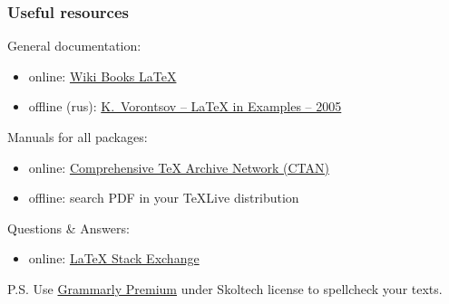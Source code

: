 \documentclass[mathserif]{beamer}
\begin{document}
\begin{frame}
    \frametitle{Useful resources}
    General documentation:
    \begin{itemize}
        \item online: \href{https://en.wikibooks.org/wiki/LaTeX}{Wiki Books \LaTeX}
        \item offline (rus): \href{http://www.ccas.ru/voron/download/voron05latex.pdf}
            {K.~Vorontsov -- \LaTeX{} in Examples -- 2005}
    \end{itemize}
    Manuals for all packages:
    \begin{itemize}
        \item online: \href{https://ctan.org/}{Comprehensive \TeX{} Archive Network (CTAN)}
        \item offline: search PDF in your TeXLive distribution
    \end{itemize}
    Questions \& Answers:
    \begin{itemize}
        \item online: \href{https://tex.stackexchange.com/}{\LaTeX{} Stack Exchange}
    \end{itemize}
    \footnotesize
    P.S. Use \href{https://grammarly.com/}{Grammarly Premium} under Skoltech license
    to spellcheck your texts.
\end{frame}
\end{document}
